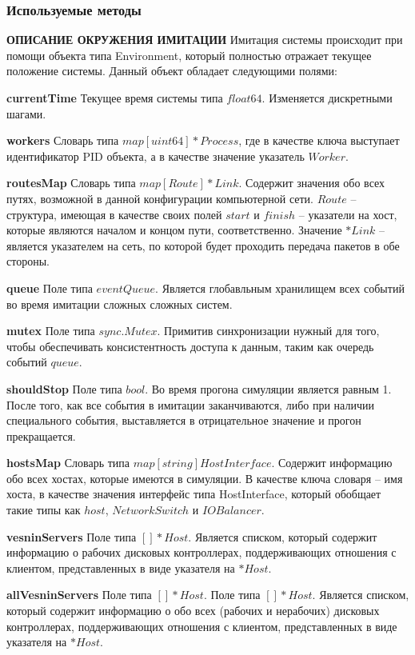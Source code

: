 \subsubsection{Используемые методы}
\textbf{ОПИСАНИЕ ОКРУЖЕНИЯ ИМИТАЦИИ}
Имитация системы происходит при помощи объекта типа Environment, который полностью отражает текущее положение системы. Данный объект обладает следующими полями:
\begin{itemize}
\textbf{currentTime}
Текущее время системы типа $float64$. Изменяется дискретными шагами.

\textbf{workers}
Словарь типа $map[uint64]*Process$, где в качестве ключа выступает идентификатор PID объекта, а в качестве значение указатель $Worker$.

\textbf{routesMap}  
Словарь типа  $map[Route]*Link$. Содержит значения обо всех путях, возможной в данной конфигурации компьютерной сети. $Route$ -- структура, имеющая в качестве своих полей $start$ и $finish$ -- указатели на хост, которые являются началом и концом пути, соответственно. Значение $*Link$ -- является указателем на сеть, по которой будет проходить передача пакетов в обе стороны.


\textbf{queue}
Поле типа $eventQueue$. Является глобавльным хранилищем всех событий во время имитации сложных сложных систем.

\textbf{mutex}         
Поле типа $sync.Mutex$. Примитив синхронизации нужный для того, чтобы обеспечивать консистентность доступа к данным, таким как очередь событий $queue$. 

\textbf{shouldStop}    
Поле типа $bool$. Во время прогона симуляции является равным 1. После того, как все события в имитации заканчиваются, либо при наличии специального события, выставляется в отрицательное значение и прогон прекращается.

\textbf{hostsMap}      
Словарь типа $map[string]HostInterface$. Содержит информацию обо всех хостах, которые имеются в симуляции. В качестве ключа словаря -- имя хоста, в качестве значения интерфейс типа HostInterface, который обобщает такие типы как $host$, $NetworkSwitch$ и $IOBalancer$.

\textbf{vesninServers}
Поле типа $[]*Host$. Является списком, который содержит информацию о рабочих дисковых контроллерах, поддерживающих отношения с клиентом, представленных в виде указателя на $*Host$.

\textbf{allVesninServers}
Поле типа $[]*Host$. Поле типа $[]*Host$. Является списком, который содержит информацию о обо всех (рабочих и нерабочих) дисковых контроллерах, поддерживающих отношения с клиентом, представленных в виде указателя на $*Host$.


\end{itemize}
